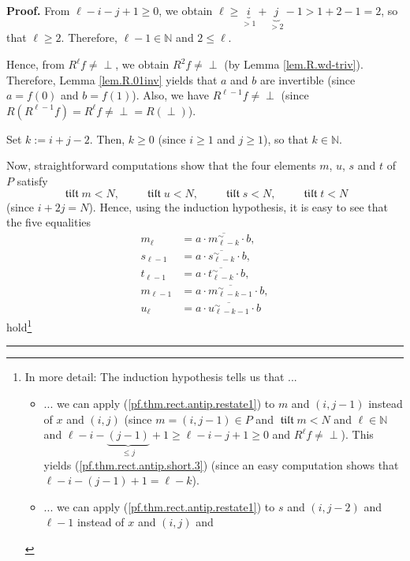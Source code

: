 \documentclass[numbers=enddot,12pt,final,onecolumn,notitlepage]{scrartcl}%
\theoremstyle{definition}
\newenvironment{vershort}{}{}
\newcommand{\undf}{\operatorname*{\bot}}
\DeclareMathOperator{\tilt}{\mathfrak{tilt}}
\newenvironment{proof}[1][Proof]{\noindent\textbf{#1.} }{\ \rule{0.5em}{0.5em}}
\begin{document}
\begin{vershort}
\begin{proof}
From $\ell-i-j+1\geq0$, we obtain $\ell\geq\underbrace{i}_{>1}+\underbrace{j}%
_{>2}-1>1+2-1=2$, so that $\ell\geq2$. Therefore, $\ell-1\in\mathbb{N}$ and
$2\leq\ell$.

Hence, from $R^{\ell}f\neq\undf$, we obtain $R^{2}f\neq\undf$ (by Lemma
\ref{lem.R.wd-triv}). Therefore, Lemma \ref{lem.R.01inv} yields that $a$ and
$b$ are invertible (since $a=f\left(  0\right)  $ and $b=f\left(  1\right)
$). Also, we have $R^{\ell-1}f\neq\undf$ (since $R\left(  R^{\ell-1}f\right)
=R^{\ell}f\neq\undf=R\left(  \undf\right)  $).

Set $k:=i+j-2$. Then, $k\geq0$ (since $i\geq1$ and $j\geq1$), so that
$k\in\mathbb{N}$.

Now, straightforward computations show that the four elements $m$, $u$, $s$
and $t$ of $P$ satisfy
\[
\tilt m<N,\ \ \ \ \ \ \ \ \ \ \tilt u<N,\ \ \ \ \ \ \ \ \ \ \tilt s<N,\ \ \ \ \ \ \ \ \ \ \tilt t<N
\]
(since $i+2j=N$). Hence, using the induction hypothesis, it is easy to see
that the five equalities%
\begin{align}
m_{\ell}  &  =a\cdot\overline{m_{\ell-k}^{\sim}}\cdot
b,\label{pf.thm.rect.antip.short.3}\\
s_{\ell-1}  &  =a\cdot\overline{s_{\ell-k}^{\sim}}\cdot
b,\label{pf.thm.rect.antip.short.4}\\
t_{\ell-1}  &  =a\cdot\overline{t_{\ell-k}^{\sim}}\cdot
b,\label{pf.thm.rect.antip.short.4b}\\
m_{\ell-1}  &  =a\cdot\overline{m_{\ell-k-1}^{\sim}}\cdot
b,\label{pf.thm.rect.antip.short.5}\\
u_{\ell}  &  =a\cdot\overline{u_{\ell-k-1}^{\sim}}\cdot b
\label{pf.thm.rect.antip.short.5b}%
\end{align}
hold\footnote{In more detail: The induction hypothesis tells us that ...
\par
\begin{itemize}
\item ... we can apply (\ref{pf.thm.rect.antip.restate1}) to $m$ and $\left(
i,j-1\right)  $ instead of $x$ and $\left(  i,j\right)  $ (since $m=\left(
i,j-1\right)  \in P$ and $\tilt m<N$ and $\ell\in\mathbb{N}$ and
$\ell-i-\underbrace{\left(  j-1\right)  }_{\leq j}+1\geq\ell-i-j+1\geq0$ and
$R^{\ell}f\neq\undf$). This yields (\ref{pf.thm.rect.antip.short.3}) (since an
easy computation shows that $\ell-i-\left(  j-1\right)  +1=\ell-k$).
\par
\item ... we can apply (\ref{pf.thm.rect.antip.restate1}) to $s$ and $\left(
i,j-2\right)  $ and $\ell-1$ instead of $x$ and $\left(  i,j\right)  $ and

\end{itemize}}
\end{proof}
\end{vershort}
\end{document}
